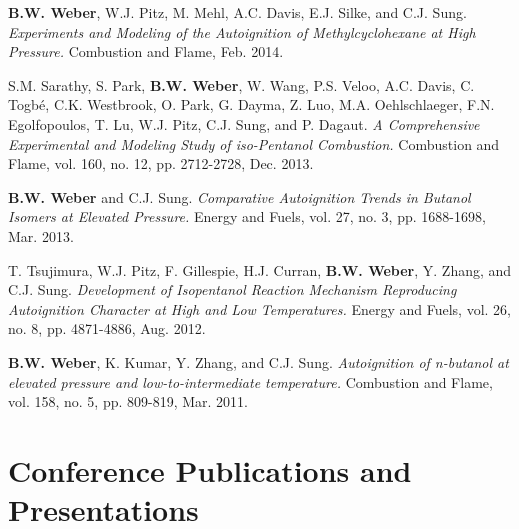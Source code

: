\begin{bibsection}
\item[] \textbf{B.W. Weber}, W.J. Pitz, M. Mehl, A.C. Davis,
        E.J. Silke, and C.J. Sung. \textit{Experiments and
        Modeling of the Autoignition of Methylcyclohexane at High
        Pressure.} Combustion and Flame, Feb. 2014.

\item[] S.M. Sarathy, S. Park, \textbf{B.W. Weber}, W. Wang,
        P.S. Veloo, A.C. Davis, C. Togbé, C.K. Westbrook, O. Park,
        G. Dayma, Z. Luo, M.A. Oehlschlaeger, F.N. Egolfopoulos,
        T. Lu, W.J. Pitz, C.J. Sung, and P. Dagaut. \textit{A
        Comprehensive Experimental and Modeling Study of iso-Pentanol
        Combustion.} Combustion and Flame, vol. 160, no. 12, pp.
        2712-2728, Dec. 2013. 

\item[] \textbf{B.W. Weber} and C.J. Sung. \textit{Comparative
        Autoignition Trends in Butanol Isomers at Elevated Pressure.}
        Energy and Fuels, vol. 27, no. 3, pp. 1688-1698, Mar. 2013. \\

\item[] T. Tsujimura, W.J. Pitz, F. Gillespie, H.J. Curran,
        \textbf{B.W. Weber}, Y. Zhang, and C.J. Sung.
        \textit{Development of Isopentanol Reaction Mechanism
        Reproducing Autoignition Character at High and Low
        Temperatures.} Energy and Fuels, vol. 26, no. 8, pp. 4871-4886,
        Aug. 2012. 

\item[] \textbf{B.W. Weber}, K. Kumar, Y. Zhang, and C.J. Sung.
        \textit{Autoignition of n-butanol at elevated pressure and
        low-to-intermediate temperature.} Combustion and Flame,
        vol. 158, no. 5, pp. 809-819, Mar. 2011.
\end{bibsection}


\section{{\sectionfont Conference Publications and Presentations}}

